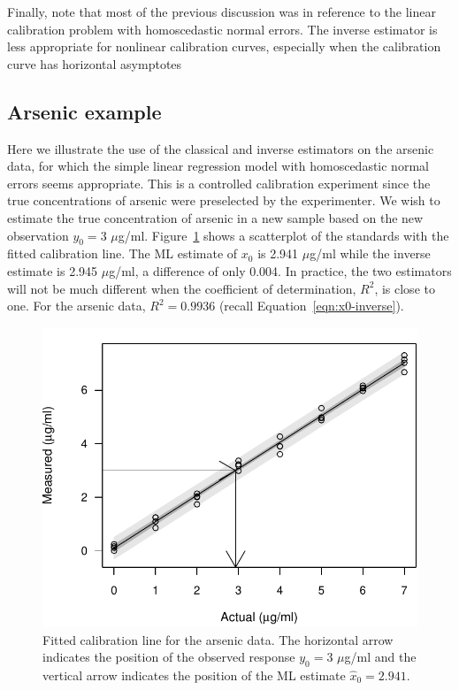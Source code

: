\documentclass[cmfont,usenames,dvipsnames,leqno]{afit-etd}\usepackage[]{graphicx}\usepackage[]{color}
\makeatletter
\def\maxwidth{ %
  \ifdim\Gin@nat@width>\linewidth
    \linewidth
  \else
    \Gin@nat@width
  \fi
}
\newenvironment{knitrout}{}{} %
\renewenvironment{knitrout}{\begin{singlespace}}{\end{singlespace}}
\newcommand{\wh}[1]{\ensuremath{\widehat{#1}}}
\makeatother
\begin{document}
Finally, note that most of the previous discussion was in reference to the linear calibration problem with homoscedastic normal errors. The inverse estimator is less appropriate for nonlinear calibration curves, especially when the calibration curve has horizontal asymptotes \citep{jones_bootstrapping_1999}

\subsection{Arsenic example}
\label{sec:example_arsenic}
Here we illustrate the use of the classical and inverse estimators on the arsenic data, for which the simple linear regression model with homoscedastic normal errors seems appropriate. This is a controlled calibration experiment since the true concentrations of arsenic were preselected by the experimenter. We wish to estimate the true concentration of arsenic in a new sample based on the new observation $y_0 = 3$ $\mu$g/ml. Figure~\ref{fig:arsenic-fit} shows a scatterplot of the standards with the fitted calibration line. The \ac{ML} estimate of $x_0$ is 2.941 $\mu$g/ml while the inverse estimate is 2.945 $\mu$g/ml, a difference of only 0.004. In practice, the two estimators will not be much different when the coefficient of determination, $R^2$, is close to one. For the arsenic data, $R^2 = 0.9936$ (recall Equation~\ref{eqn:x0-inverse}).

\begin{knitrout}
\color{fgcolor}\begin{figure}[H]

\includegraphics[width=\maxwidth]{figure/arsenic-fit} \caption[Fitted calibration line for the arsenic data]{Fitted calibration line for the arsenic data. The horizontal arrow indicates the position of the observed response $y_0 = 3$ $\mu$g/ml and the vertical arrow indicates the position of the \ac{ML} estimate $\wh{x}_0 = 2.941$.\label{fig:arsenic-fit}}
\end{figure}


\end{knitrout}
\end{document}
